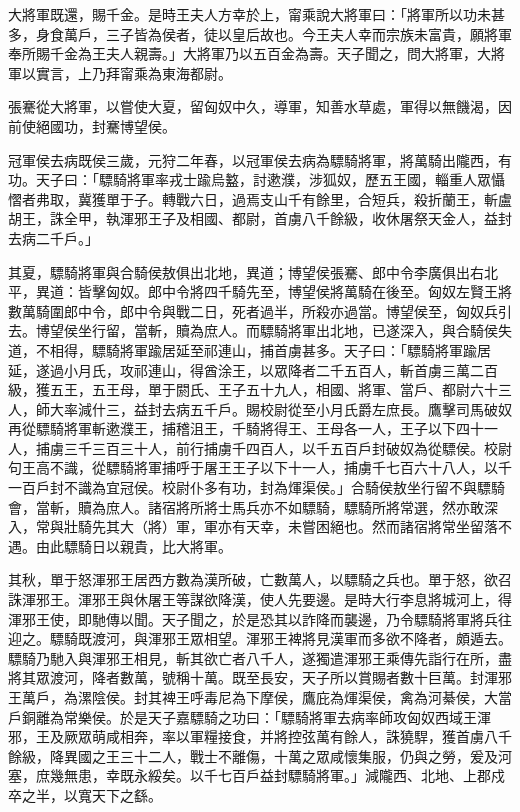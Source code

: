 \begin{pinyinscope}
大將軍既還，賜千金。是時王夫人方幸於上，甯乘說大將軍曰：「將軍所以功未甚多，身食萬戶，三子皆為侯者，徒以皇后故也。今王夫人幸而宗族未富貴，願將軍奉所賜千金為王夫人親壽。」大將軍乃以五百金為壽。天子聞之，問大將軍，大將軍以實言，上乃拜甯乘為東海都尉。

張騫從大將軍，以嘗使大夏，留匈奴中久，導軍，知善水草處，軍得以無饑渴，因前使絕國功，封騫博望侯。

冠軍侯去病既侯三歲，元狩二年春，以冠軍侯去病為驃騎將軍，將萬騎出隴西，有功。天子曰：「驃騎將軍率戎士踰烏盭，討遬濮，涉狐奴，歷五王國，輜重人眾懾慴者弗取，冀獲單于子。轉戰六日，過焉支山千有餘里，合短兵，殺折蘭王，斬盧胡王，誅全甲，執渾邪王子及相國、都尉，首虜八千餘級，收休屠祭天金人，益封去病二千戶。」

其夏，驃騎將軍與合騎侯敖俱出北地，異道；博望侯張騫、郎中令李廣俱出右北平，異道：皆擊匈奴。郎中令將四千騎先至，博望侯將萬騎在後至。匈奴左賢王將數萬騎圍郎中令，郎中令與戰二日，死者過半，所殺亦過當。博望侯至，匈奴兵引去。博望侯坐行留，當斬，贖為庶人。而驃騎將軍出北地，已遂深入，與合騎侯失道，不相得，驃騎將軍踰居延至祁連山，捕首虜甚多。天子曰：「驃騎將軍踰居延，遂過小月氏，攻祁連山，得酋涂王，以眾降者二千五百人，斬首虜三萬二百級，獲五王，五王母，單于閼氏、王子五十九人，相國、將軍、當戶、都尉六十三人，師大率減什三，益封去病五千戶。賜校尉從至小月氏爵左庶長。鷹擊司馬破奴再從驃騎將軍斬遬濮王，捕稽沮王，千騎將得王、王母各一人，王子以下四十一人，捕虜三千三百三十人，前行捕虜千四百人，以千五百戶封破奴為從驃侯。校尉句王高不識，從驃騎將軍捕呼于屠王王子以下十一人，捕虜千七百六十八人，以千一百戶封不識為宜冠侯。校尉仆多有功，封為煇渠侯。」合騎侯敖坐行留不與驃騎會，當斬，贖為庶人。諸宿將所將士馬兵亦不如驃騎，驃騎所將常選，然亦敢深入，常與壯騎先其大（將）軍，軍亦有天幸，未嘗困絕也。然而諸宿將常坐留落不遇。由此驃騎日以親貴，比大將軍。

其秋，單于怒渾邪王居西方數為漢所破，亡數萬人，以驃騎之兵也。單于怒，欲召誅渾邪王。渾邪王與休屠王等謀欲降漢，使人先要邊。是時大行李息將城河上，得渾邪王使，即馳傳以聞。天子聞之，於是恐其以詐降而襲邊，乃令驃騎將軍將兵往迎之。驃騎既渡河，與渾邪王眾相望。渾邪王裨將見漢軍而多欲不降者，頗遁去。驃騎乃馳入與渾邪王相見，斬其欲亡者八千人，遂獨遣渾邪王乘傳先詣行在所，盡將其眾渡河，降者數萬，號稱十萬。既至長安，天子所以賞賜者數十巨萬。封渾邪王萬戶，為漯陰侯。封其裨王呼毒尼為下摩侯，鷹庇為煇渠侯，禽為河綦侯，大當戶銅離為常樂侯。於是天子嘉驃騎之功曰：「驃騎將軍去病率師攻匈奴西域王渾邪，王及厥眾萌咸相奔，率以軍糧接食，并將控弦萬有餘人，誅獟駻，獲首虜八千餘級，降異國之王三十二人，戰士不離傷，十萬之眾咸懷集服，仍與之勞，爰及河塞，庶幾無患，幸既永綏矣。以千七百戶益封驃騎將軍。」減隴西、北地、上郡戍卒之半，以寬天下之繇。


\end{pinyinscope}
